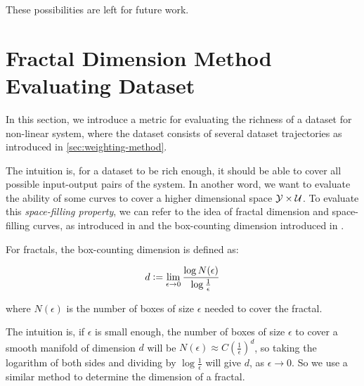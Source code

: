 These possibilities are left for future work.


\section{Fractal Dimension Method Evaluating Dataset}\label{sec:fractal-dimension-method}

In this section, we introduce a metric for evaluating the richness of a dataset for non-linear system, where the dataset consists of several dataset trajectories as introduced in \cref{sec:weighting-method}.

The intuition is, for a dataset to be rich enough, it should be able to cover all possible input-output pairs of the system.
In another word, we want to evaluate the ability of some curves to cover a higher dimensional space $\mathcal{Y} \times \mathcal{U}$.
To evaluate this \emph{space-filling property}, we can refer to the idea of fractal dimension and space-filling curves, as introduced in \cite{saganSpaceFillingCurves1994} and the box-counting dimension introduced in \cite{kennethAlternativeDefinitionsDimension2003}.


For fractals, the box-counting dimension is defined as:

\begin{equation}
    \label{eq:box-counting-dimension-limit}
    d \vcentcolon= \lim_{\epsilon \to 0} \frac{\log N(\epsilon)}{\log \frac{1}{\epsilon}}
\end{equation}

where $N(\epsilon)$ is the number of boxes of size $\epsilon$ needed to cover the fractal.

The intuition is, if $\epsilon$ is small enough, the number of boxes of size $\epsilon$ to cover a smooth manifold of dimension $d$ will be $N(\epsilon) \approx C \left(\frac{1}{\epsilon}\right)^d$, so taking the logarithm of both sides and dividing by $\log \frac{1}{\epsilon}$ will give $d$, as $\epsilon \to 0$.
So we use a similar method to determine the dimension of a fractal.

